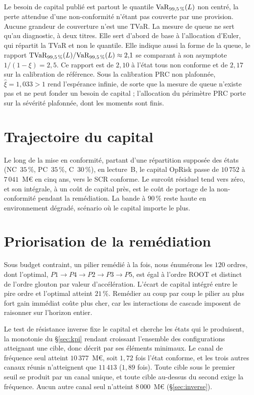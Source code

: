 Le besoin de capital publié est partout le quantile $\mathrm{VaR}_{99{,}5\,\%}(L)$ non centré, la perte
attendue d'une non-conformité n'étant pas couverte par une provision. Aucune grandeur de couverture
n'est une TVaR. La mesure de queue ne sert qu'au diagnostic, à deux titres. Elle sert d'abord de
base à l'allocation d'Euler, qui répartit la TVaR et non le quantile. Elle indique aussi la forme de la queue, le rapport
$\mathrm{TVaR}_{99{,}5\,\%}(L)/\mathrm{VaR}_{99{,}5\,\%}(L) \approx 2{,}1$ se comparant à son asymptote
$1/(1-\xi) = 2{,}5$. Ce rapport est de $2{,}10$ à l'état tous non conforme et de $2{,}17$ sur la
calibration de référence. Sous la calibration PRC non plafonnée, $\hat\xi=1{,}033>1$ rend l'espérance infinie, de
sorte que la mesure de queue n'existe pas et ne peut fonder un besoin de capital ; l'allocation du
périmètre PRC porte sur la sévérité plafonnée, dont les moments sont finis.

\section{Trajectoire du capital}
\label{sec:res-traj}

Le long de la mise en conformité, partant d'une répartition supposée des états (NC~$35\,\%$, PC~$35\,\%$,
C~$30\,\%$), en lecture~B, le capital OpRisk passe de $10\,752$ à $7\,041$~M\euro{} en cinq ans, vers le SCR
conforme. Le surcoût résiduel tend vers zéro, et son intégrale, à un coût de capital près, est le
coût de portage de la non-conformité pendant la remédiation. La bande à $90\,\%$ reste haute en
environnement dégradé, scénario où le capital importe le plus.

\section{Priorisation de la remédiation}
\label{sec:res-prio}

Sous budget contraint, un pilier remédié à la fois, nous énumérons les $120$ ordres, dont
l'optimal, $P1\to P4\to P2\to P3\to P5$, est égal à l'ordre ROOT et distinct de l'ordre glouton par
valeur d'accélération. L'écart de capital intégré entre le pire ordre et l'optimal atteint
$21\,\%$. Remédier au coup par coup le pilier au plus fort gain immédiat coûte plus cher, car les
interactions de cascade imposent de raisonner sur l'horizon entier.

Le test de résistance inverse fixe le capital et cherche les états qui le produisent, la monotonie
du \S\ref{sec:kpi} rendant croissant l'ensemble des configurations atteignant une cible, donc décrit
par ses éléments minimaux. Le canal de fréquence seul atteint $10\,377$~M\euro, soit $1{,}72$ fois
l'état conforme, et les trois autres canaux réunis n'atteignent que $11\,413$ ($1{,}89$ fois).
Toute cible sous le premier seuil se produit par un canal unique, et toute cible au-dessus du second
exige la fréquence. Aucun autre canal seul n'atteint $8\,000$~M\euro{} (\S\ref{sec:inverse}).

